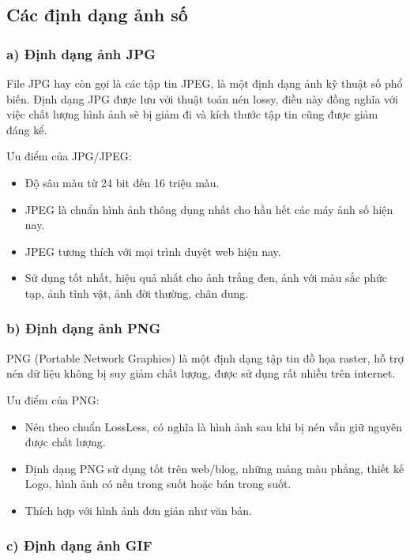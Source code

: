 \documentclass[a4paper,14pt]{extreport}
\begin{document}
\subsection{Các định dạng ảnh số}
\subsubsection*{a) Định dạng ảnh JPG}

File JPG hay còn gọi là các tập tin JPEG, là một định dạng ảnh kỹ thuật số phổ biến. Định dạng JPG được lưu với thuật toán nén lossy, điều này đồng nghĩa với việc chất lượng hình ảnh sẽ bị giảm đi và kích thước tập tin cũng được giảm đáng kể.\cite{img-format}

Ưu điểm của JPG/JPEG:

\begin{itemize}
    \item Độ sâu màu từ 24 bit đến 16 triệu màu.
    \item JPEG là chuẩn hình ảnh thông dụng nhất cho hầu hết các máy ảnh số hiện nay.
    \item JPEG tương thích với mọi trình duyệt web hiện nay.
    \item Sử dụng tốt nhất, hiệu quả nhất cho ảnh trắng đen, ảnh với màu sắc phức tạp, ảnh tĩnh vật, ảnh đời thường, chân dung.
\end{itemize}

\subsubsection*{b) Định dạng ảnh PNG}

PNG (Portable Network Graphics) là một định dạng tập tin đồ họa raster, hỗ trợ nén dữ liệu không bị suy giảm chất lượng, được sử dụng rất nhiều trên internet.\cite{img-format}

Ưu điểm của PNG:

\begin{itemize}
    \item Nén theo chuẩn LossLess, có nghĩa là hình ảnh sau khi bị nén vẫn giữ nguyên được chất lượng.
    \item Định dạng PNG sử dụng tốt trên web/blog, những mảng màu phẳng, thiết kế Logo, hình ảnh có nền trong suốt hoặc bán trong suốt.
    \item Thích hợp với hình ảnh đơn giản như văn bản.
\end{itemize}

\subsubsection*{c) Định dạng ảnh GIF}
\end{document}
